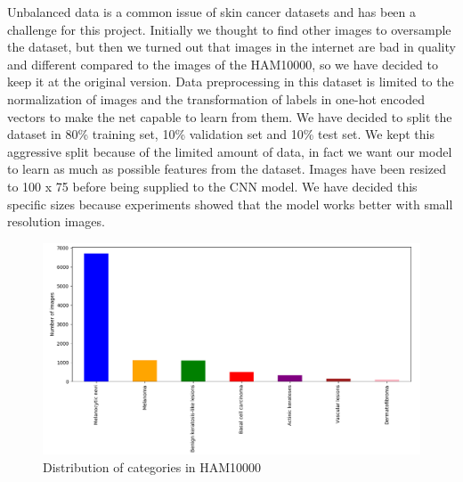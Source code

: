 	Unbalanced data is a common issue of skin cancer datasets and has been a challenge for this project. Initially we thought to find other images to oversample the dataset, but then we turned out that images in the internet are bad in quality and different compared to the images of the HAM10000, so we have decided to keep it at the original version.
	Data preprocessing in this dataset is limited to the normalization of images and the transformation of labels in one-hot encoded vectors to make the net capable to learn from them. We have decided to split the dataset in 80\% training set, 10\% validation set and 10\% test set. We kept this aggressive split because of the limited amount of data, in fact we want our model to learn as much as possible features from the dataset. Images have been resized to 100 x 75 before being supplied to the CNN model. We have decided this specific sizes because experiments showed that the model works better with small resolution images.
	
	\begin{figure}[H]
		\centering
		\includegraphics[width=15cm]{images/graph1.png}
		\caption{Distribution of categories in HAM10000}
		\label{fig:graph1}
	\end{figure}
